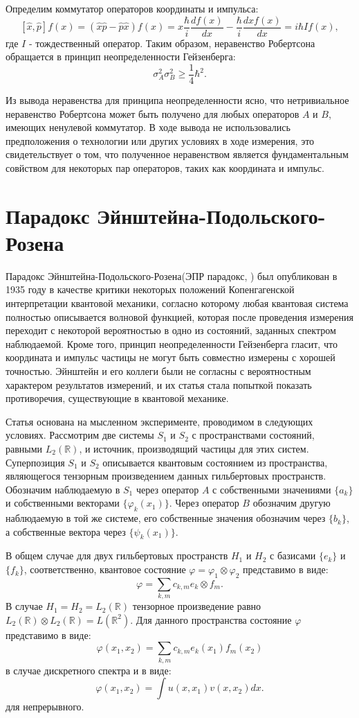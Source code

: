 \documentclass[11pt]{article}
\begin{document}
Определим коммутатор операторов координаты и импульса:
\[
[\hat{x}, \hat{p}]f(x) = (\hat{x}\hat{p} - \hat{p}\hat{x})f(x) = x\frac{\hbar}{i}\frac{df(x)}{dx} - \frac{\hbar}{i}\frac{d xf(x)}{dx} = i\hbar If(x),
\]
где $I$ - тождественный оператор. Таким образом, неравенство Робертсона обращается в принцип неопределенности Гейзенберга:
\[
\sigma_A^2\sigma_B^2 \geq \frac{1}{4}\hbar^2.
\]

Из вывода неравенства для принципа неопределенности ясно, что нетривиальное неравенство Робертсона может быть получено для любых операторов $A$ и $B$, имеющих ненулевой коммутатор. В ходе вывода не использовались предположения о технологии или других условиях в ходе измерения, это свидетельствует о том, что полученное неравенством является фундаментальным совйством для некоторых пар операторов, таких как координата и импульс.

\section{Парадокс Эйнштейна-Подольского-Розена}
Парадокс Эйнштейна-Подольского-Розена(ЭПР парадокс, \cite{EPR}) был опубликован в 1935 году в качестве критики некоторых положений Копенгагенской интерпретации квантовой механики, согласно которому любая квантовая система полностью описывается волновой функцией, которая после проведения измерения переходит с некоторой вероятностью в одно из состояний, заданных спектром наблюдаемой. Кроме того, принцип неопределенности Гейзенберга гласит, что координата и импульс частицы не могут быть совместно измерены с хорошей точностью. Эйнштейн и его коллеги были не согласны с вероятностным характером результатов измерений, и их статья стала попыткой показать противоречия, существующие в квантовой механике.

Статья \cite{EPR} основана на мысленном эксперименте, проводимом в следующих условиях. Рассмотрим две системы $S_1$ и $S_2$ с пространствами состояний, равными $L_2(\mathbb{R})$, и источник, производящий частицы для этих систем.  Суперпозиция  $S_1$ и $S_2$ описывается квантовым состоянием из пространства, являющегося тензорным произведением данных гильбертовых пространств.  
Обозначим наблюдаемую в $S_1$ через оператор $A$ с собственными значениями $\{a_k\}$ и собственными векторами $\{\varphi_k(x_1)\}$. Через оператор $B$ обозначим другую наблюдаемую в той же системе, его собственные значения обозначим через $\{b_k\}$, а собственные вектора через $\{\psi_k(x_1)\}$. 

В общем случае для двух гильбертовых пространств $H_1$ и $H_2$ с базисами $\{e_k\}$ и $\{f_k\}$, соответственно, квантовое состояние $\varphi = \varphi_1\otimes\varphi_2$ представимо в виде:
\[
\varphi = \sum_{k, m}c_{k, m}e_k\otimes f_m.
\]
В случае  $H_1 = H_2 = L_2(\mathbb{R})$ тензорное произведение равно $L_2(\mathbb{R})\otimes L_2(\mathbb{R}) = L(\mathbb{R}^2)$. Для данного пространства состояние $\varphi$ представимо в виде:
\[
\varphi (x_1, x_2) = \sum_{k, m}c_{k, m}e_k(x_1)f_m(x_2)
\]
в случае дискретного спектра и в виде:
\[
\varphi (x_1, x_2) = \int u(x, x_1)v(x, x_2)dx.
\]
для непрерывного.
\end{document}
